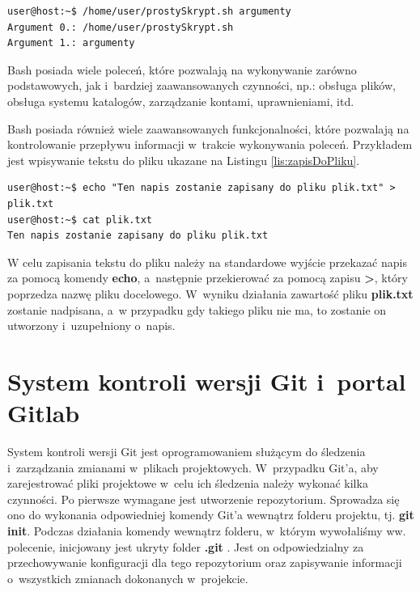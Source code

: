 \begin{lstlisting}[language=bash,language=Cmd,caption={Przykład działania Skryptu z~Listingu \ref{lst:prostySkrypt}}]
user@host:~$ /home/user/prostySkrypt.sh argumenty
Argument 0.: /home/user/prostySkrypt.sh
Argument 1.: argumenty
\end{lstlisting}

Bash posiada wiele poleceń, które pozwalają na wykonywanie zarówno podstawowych, jak i~bardziej zaawansowanych czynności, np.: obsługa plików, obsługa systemu katalogów, zarządzanie kontami, uprawnieniami, itd.\par
Bash posiada również wiele zaawansowanych funkcjonalności, które pozwalają na kontrolowanie przepływu informacji w~trakcie wykonywania poleceń. Przykładem jest wpisywanie tekstu do pliku ukazane na Listingu \ref{lis:zapisDoPliku}.

\begin{lstlisting}[label={lis:zapisDoPliku},language=Cmd,caption={Przykład zapisu tekstu do pliku}]
user@host:~$ echo "Ten napis zostanie zapisany do pliku plik.txt" > plik.txt
user@host:~$ cat plik.txt
Ten napis zostanie zapisany do pliku plik.txt
\end{lstlisting}

W celu zapisania tekstu do pliku należy na standardowe wyjście przekazać napis za pomocą komendy \textbf{echo}, a~następnie przekierować za pomocą zapisu \textbf{>}, który poprzedza nazwę pliku docelowego. W~wyniku działania zawartość pliku \textbf{plik.txt} zostanie nadpisana, a~w przypadku gdy takiego pliku nie ma, to zostanie on utworzony i~uzupełniony o~napis.\par


\section{System kontroli wersji Git i~portal Gitlab}
System kontroli wersji Git jest oprogramowaniem służącym do śledzenia i~zarządzania zmianami w~plikach projektowych. W~przypadku Git'a, aby zarejestrować pliki projektowe w~celu ich śledzenia należy wykonać kilka czynności. Po pierwsze wymagane jest utworzenie repozytorium. Sprowadza się ono do wykonania odpowiedniej komendy Git'a wewnątrz folderu projektu, tj. \textbf{git init}. Podczas działania komendy wewnątrz folderu, w~którym wywołaliśmy ww. polecenie, inicjowany jest ukryty folder \textbf{.git}
. Jest on odpowiedzialny za przechowywanie konfiguracji dla tego repozytorium oraz zapisywanie informacji o~wszystkich zmianach dokonanych w~projekcie.

